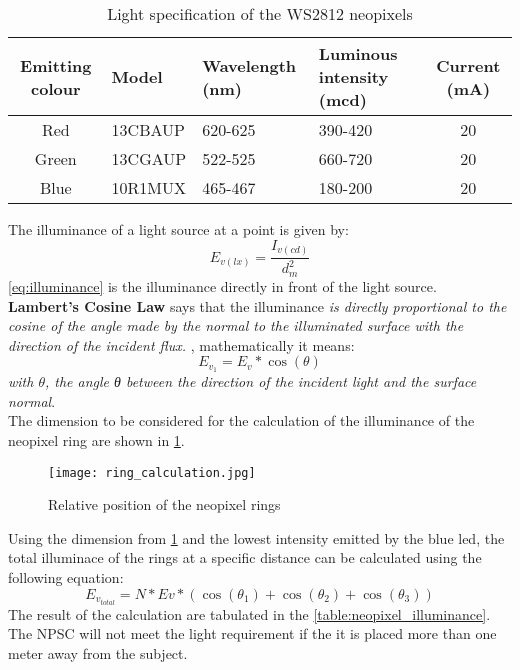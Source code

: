 \begin{table}[h!]
\centering
\caption{Light specification of the WS2812 neopixels}
\label{table:neopixel_specs}
\begin{tabular}{cp{6em}p{6em}p{6em}c}
\hline
\hline
\textbf{Emitting colour} & \textbf{Model} & \textbf{Wavelength (nm)} & \textbf{Luminous intensity (mcd)}  & \textbf{Current (mA)}\\ 
\hline
Red & 13CBAUP & 620-625 & 390-420 & 20\\
Green & 13CGAUP & 522-525 & 660-720 & 20\\
Blue & 10R1MUX & 465-467 & 180-200 & 20\\
\hline
\hline
\end{tabular}
\end{table}

The illuminance of a light source at a point is given by: 
\begin{equation}\label{eq:illuminance}
E_{v(lx)}=\frac{I_{v(cd)}}{d_m^2}
\end{equation}
\cref{eq:illuminance} is the illuminance directly in front of the light source. \textbf{Lambert's Cosine Law} says that the illuminance \textit{is directly proportional to the cosine of the angle made by the normal to the illuminated surface with the direction of the incident flux.} \cite{optical}, mathematically it means:
\begin{equation}\label{eq:lambert}
E_{v_1}=E_v*\cos(\theta)
\end{equation}
\textit{with $\theta$, the angle θ between the direction of the incident light and the surface normal}.\\
The dimension to be considered for the calculation of the illuminance of the neopixel ring are shown in \cref{fig:neopixel_ring_dimension}.
\begin{figure}[h!]
\centering
\texttt{[image: ring\_calculation.jpg]}
\caption{Relative position of the neopixel rings}
\label{fig:neopixel_ring_dimension}
\end{figure}
Using the dimension from \cref{fig:neopixel_ring_dimension} and the lowest intensity emitted by the blue led, the total illuminace of the rings at a specific distance can be calculated using the following equation:
\begin{equation}\label{eq:total_illuminance}
E_{v_{total}} = N*Ev*(\cos(\theta_1)+\cos(\theta_2)+\cos(\theta_3))
\end{equation}
The result of the calculation are tabulated in the \cref{table:neopixel_illuminance}. The NPSC will not meet the light requirement if the it is placed more than one meter away from the subject.

